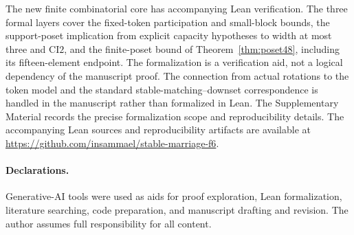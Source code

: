 \documentclass[11pt]{article}
\numberwithin{equation}{section}
\theoremstyle{definition}
\theoremstyle{remark}
\begin{document}
The new finite combinatorial core has accompanying Lean verification.
The three formal layers cover the fixed-token participation and small-block
bounds, the support-poset implication from explicit capacity hypotheses to
width at most three and $\mathrm{CI2}$, and the finite-poset bound of
Theorem~\ref{thm:poset48}, including its fifteen-element endpoint.
The formalization is a verification aid, not a logical dependency of the
manuscript proof.
The connection from actual rotations to the token model and the standard
stable-matching--downset correspondence is handled in the manuscript rather
than formalized in Lean.
The Supplementary Material records the precise formalization scope and
reproducibility details.
The accompanying Lean sources and reproducibility artifacts are available at
\url{https://github.com/insammael/stable-marriage-f6}.

\paragraph{Declarations.} Generative-AI tools were used as aids for proof exploration, Lean
formalization, literature searching, code preparation, and manuscript
drafting and revision.  The author assumes full responsibility for all
content.
\end{document}
